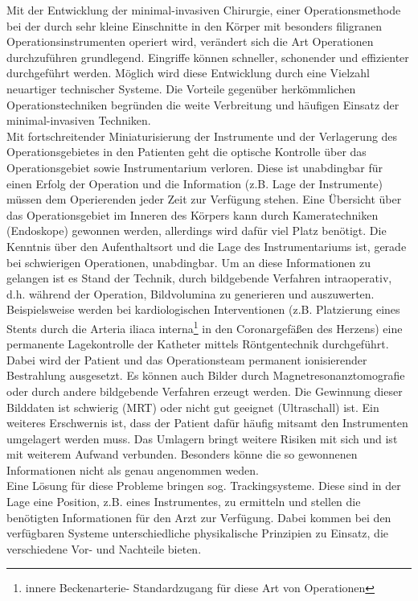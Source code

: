 Mit der Entwicklung der minimal-invasiven Chirurgie, einer Operationsmethode bei der durch sehr kleine Einschnitte in den Körper mit besonders filigranen Operationsinstrumenten operiert wird, verändert sich die Art Operationen durchzuführen grundlegend. Eingriffe können schneller, schonender und effizienter durchgeführt werden. Möglich wird diese Entwicklung durch eine Vielzahl neuartiger technischer Systeme. Die Vorteile gegenüber herkömmlichen Operationstechniken begründen die weite Verbreitung und häufigen Einsatz der minimal-invasiven Techniken.\\
Mit fortschreitender Miniaturisierung der Instrumente und der Verlagerung des Operationsgebietes in den Patienten geht die optische Kontrolle über das Operationsgebiet sowie Instrumentarium verloren. Diese ist unabdingbar für einen Erfolg der Operation und die Information (z.B. Lage der Instrumente) müssen dem Operierenden jeder Zeit zur Verfügung stehen. Eine Übersicht über das Operationsgebiet im Inneren des Körpers kann durch Kameratechniken (Endoskope) gewonnen werden, allerdings wird dafür viel Platz benötigt. Die Kenntnis über den Aufenthaltsort und die Lage des Instrumentariums ist, gerade bei schwierigen Operationen, unabdingbar. Um an diese Informationen zu gelangen ist es Stand der Technik, durch bildgebende Verfahren intraoperativ, d.h. während der Operation, Bildvolumina zu generieren und auszuwerten.\\
Beispielsweise werden bei kardiologischen Interventionen (z.B. Platzierung eines Stents durch die Arteria iliaca interna\footnote {innere Beckenarterie- Standardzugang für diese Art von Operationen} in den Coronargefäßen des Herzens) eine permanente Lagekontrolle der Katheter mittels Röntgentechnik durchgeführt. Dabei wird der Patient und das Operationsteam permanent ionisierender Bestrahlung ausgesetzt. Es können auch Bilder durch Magnetresonanztomografie oder durch andere bildgebende Verfahren erzeugt werden. Die Gewinnung dieser Bilddaten ist schwierig (MRT) oder nicht gut geeignet (Ultraschall) ist. Ein weiteres Erschwernis ist, dass der Patient dafür häufig mitsamt den Instrumenten umgelagert werden muss. Das Umlagern bringt weitere Risiken mit sich und ist mit weiterem Aufwand verbunden. Besonders könne die so gewonnenen Informationen nicht als genau angenommen weden.\\
Eine Lösung für diese Probleme bringen sog. Trackingsysteme. Diese sind in der Lage eine Position, z.B. eines Instrumentes, zu ermitteln und stellen die benötigten Informationen für den Arzt zur Verfügung. Dabei kommen bei den verfügbaren Systeme unterschiedliche physikalische Prinzipien zu Einsatz, die verschiedene Vor- und Nachteile bieten.\\
